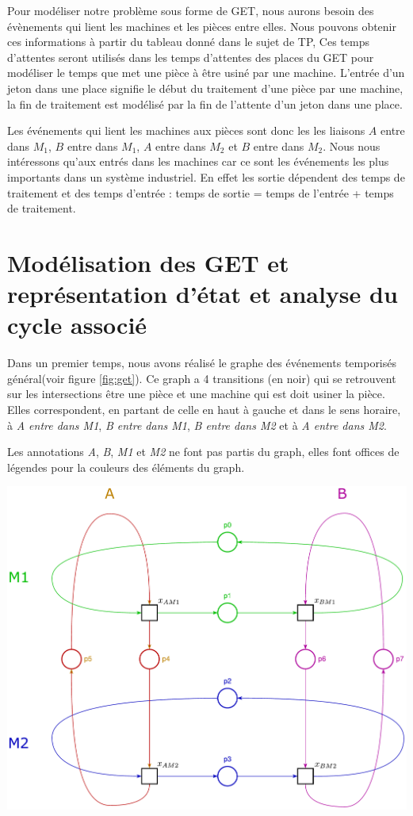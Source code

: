 Pour modéliser notre problème sous forme de GET, nous aurons besoin des évènements qui lient les machines et les pièces entre elles. Nous pouvons obtenir ces informations à partir du tableau donné dans le sujet de TP,  Ces temps d'attentes seront utilisés dans les temps d'attentes des places du GET pour modéliser le temps que met une pièce à être usiné par une machine. L'entrée d'un jeton dans une place signifie le début du traitement d'une pièce par une machine, la fin de traitement est modélisé par la fin de l'attente d'un jeton dans une place. 

Les événements qui lient les machines aux pièces sont donc les les liaisons $A$ entre dans $M_1$, $B$ entre dans $M_1$, $A$ entre dans $M_2$ et $B$ entre dans $M_2$. Nous nous intéressons qu'aux entrés dans les machines car ce sont les événements les plus importants dans un système industriel. En effet les sortie dépendent des temps de traitement et des temps d'entrée : temps de sortie = temps de l'entrée + temps de traitement.

\section{Modélisation des GET et représentation d'état et analyse du cycle associé}

Dans un premier temps, nous avons réalisé le graphe des événements temporisés général(voir figure \ref{fig:get}). Ce graph a 4 transitions (en noir) qui se retrouvent sur les intersections être une pièce et une machine qui est doit usiner la pièce. Elles correspondent, en partant de celle en haut à gauche et dans le sens horaire, à \emph{A entre dans M1}, \emph{B entre dans M1}, \emph{B entre dans M2} et à \emph{A entre dans M2}. 

Les annotations \emph{A}, \emph{B}, \emph{M1} et \emph{M2} ne font pas partis du graph, elles font offices de légendes pour la couleurs des éléments du graph.

\includegraphics[width = \textwidth]{./II/images/GET.pdf}

